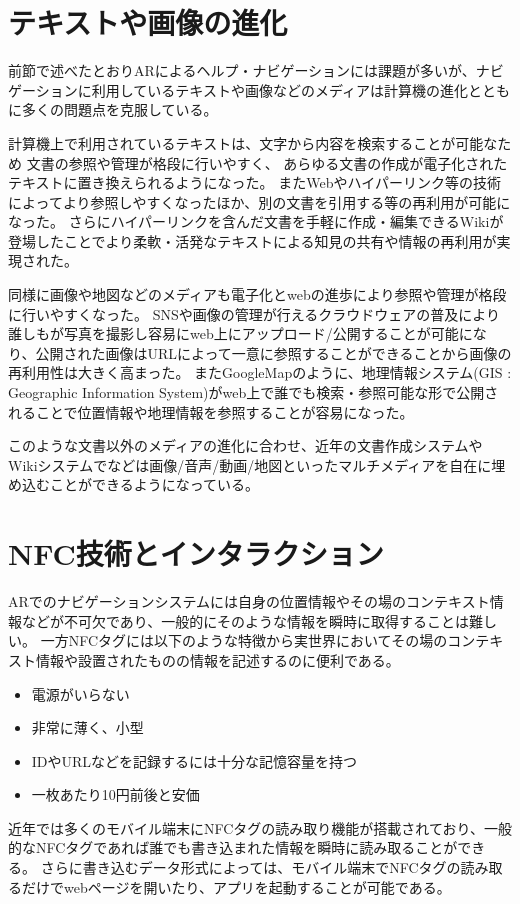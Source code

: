 \section{テキストや画像の進化}
前節で述べたとおりARによるヘルプ・ナビゲーションには課題が多いが、ナビゲーションに利用しているテキストや画像などのメディアは計算機の進化とともに多くの問題点を克服している。

計算機上で利用されているテキストは、文字から内容を検索することが可能なため 文書の参照や管理が格段に行いやすく、
あらゆる文書の作成が電子化されたテキストに置き換えられるようになった。
またWebやハイパーリンク等の技術によってより参照しやすくなったほか、別の文書を引用する等の再利用が可能になった。
さらにハイパーリンクを含んだ文書を手軽に作成・編集できるWiki\cite{Leuf2001TheWW}が登場したことでより柔軟・活発なテキストによる知見の共有や情報の再利用が実現された。

同様に画像や地図などのメディアも電子化とwebの進歩により参照や管理が格段に行いやすくなった。
SNSや画像の管理が行えるクラウドウェアの普及により誰しもが写真を撮影し容易にweb上にアップロード/公開することが可能になり、公開された画像はURLによって一意に参照することができることから画像の再利用性は大きく高まった。
またGoogleMapのように、地理情報システム(GIS : Geographic Information System)がweb上で誰でも検索・参照可能な形で公開されることで位置情報や地理情報を参照することが容易になった。

このような文書以外のメディアの進化に合わせ、近年の文書作成システムやWikiシステムでなどは画像/音声/動画/地図といったマルチメディアを自在に埋め込むことができるようになっている。


\section{NFC技術とインタラクション}
ARでのナビゲーションシステムには自身の位置情報やその場のコンテキスト情報などが不可欠であり、一般的にそのような情報を瞬時に取得することは難しい。
一方NFCタグには以下のような特徴から実世界においてその場のコンテキスト情報や設置されたものの情報を記述するのに便利である。

\begin{itemize}
  \item 電源がいらない
  \item 非常に薄く、小型
  \item IDやURLなどを記録するには十分な記憶容量を持つ
  \item 一枚あたり10円前後と安価
\end{itemize}

近年では多くのモバイル端末にNFCタグの読み取り機能が搭載されており、一般的なNFCタグであれば誰でも書き込まれた情報を瞬時に読み取ることができる。
さらに書き込むデータ形式によっては、モバイル端末でNFCタグの読み取るだけでwebページを開いたり、アプリを起動することが可能である。

